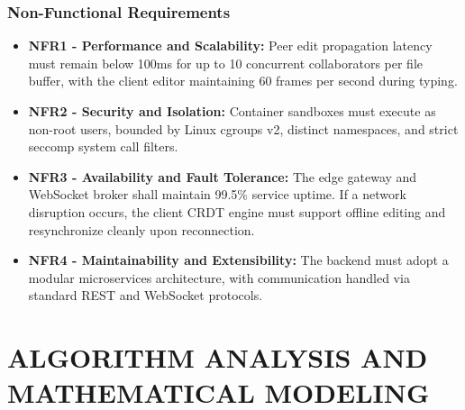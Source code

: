 \documentclass[12pt,a4paper]{report}
\begin{document}
\subsection{Non-Functional Requirements}
\begin{itemize}
    \item \textbf{NFR1 - Performance and Scalability:} Peer edit propagation latency must remain below 100ms for up to 10 concurrent collaborators per file buffer, with the client editor maintaining 60 frames per second during typing.
    \item \textbf{NFR2 - Security and Isolation:} Container sandboxes must execute as non-root users, bounded by Linux cgroups v2, distinct namespaces, and strict seccomp system call filters.
    \item \textbf{NFR3 - Availability and Fault Tolerance:} The edge gateway and WebSocket broker shall maintain 99.5\% service uptime. If a network disruption occurs, the client CRDT engine must support offline editing and resynchronize cleanly upon reconnection.
    \item \textbf{NFR4 - Maintainability and Extensibility:} The backend must adopt a modular microservices architecture, with communication handled via standard REST and WebSocket protocols.
\end{itemize}

\chapter{ALGORITHM ANALYSIS AND MATHEMATICAL MODELING}
\end{document}
